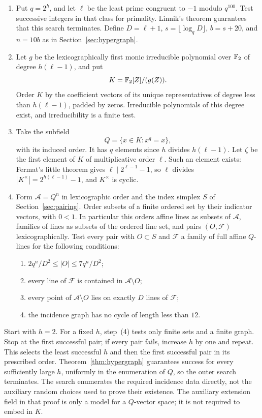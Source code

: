 \begin{enumerate}[label=\textup{(\arabic*)}]
\item Put $q=2^h$, and let $\ell$ be the least prime congruent to $-1$ modulo $q^{100}$. Test successive integers in that class for primality. Linnik's theorem guarantees that this search terminates. Define $D=\ell+1$, $s=\lfloor\log_qD\rfloor$, $b=s+20$, and $n=10b$ as in Section~\ref{sec:hypergraph}.
\item Let $g$ be the lexicographically first monic irreducible polynomial over $\mathbb F_2$ of degree $h(\ell-1)$, and put
\begin{equation}
\label{eq:exact-field}
K=\mathbb F_2[Z]/(g(Z)).
\end{equation}
Order $K$ by the coefficient vectors of its unique representatives of degree less than $h(\ell-1)$, padded by zeros. Irreducible polynomials of this degree exist, and irreducibility is a finite test.
\item Take the subfield
\[
Q=\{x\in K:x^q=x\},
\]
with its induced order. It has $q$ elements since $h$ divides $h(\ell-1)$. Let $\zeta$ be the first element of $K$ of multiplicative order $\ell$. Such an element exists: Fermat's little theorem gives $\ell\mid 2^{\ell-1}-1$, so $\ell$ divides $|K^\times|=2^{h(\ell-1)}-1$, and $K^\times$ is cyclic.
\item Form $\mathcal A=Q^n$ in lexicographic order and the index simplex $S$ of Section~\ref{sec:pairing}. Order subsets of a finite ordered set by their indicator vectors, with $0<1$. In particular this orders affine lines as subsets of $\mathcal A$, families of lines as subsets of the ordered line set, and pairs $(O,\mathcal F)$ lexicographically. Test every pair with $O\subset S$ and $\mathcal F$ a family of full affine $Q$-lines for the following conditions:
\begin{enumerate}[label=\textup{(\alph*)}]
\item $2q^n/D^2\le |O|\le7q^n/D^2$;
\item every line of $\mathcal F$ is contained in $\mathcal A\setminus O$;
\item every point of $\mathcal A\setminus O$ lies on exactly $D$ lines of $\mathcal F$;
\item the incidence graph has no cycle of length less than $12$.
\end{enumerate}
\end{enumerate}
Start with $h=2$. For a fixed $h$, step~\textup{(4)} tests only finite sets and a finite graph. Stop at the first successful pair; if every pair fails, increase $h$ by one and repeat. This selects the least successful $h$ and then the first successful pair in its prescribed order. Theorem~\ref{thm:hypergraph} guarantees success for every sufficiently large $h$, uniformly in the enumeration of $Q$, so the outer search terminates. The search enumerates the required incidence data directly, not the auxiliary random choices used to prove their existence. The auxiliary extension field in that proof is only a model for a $Q$-vector space; it is not required to embed in $K$.

